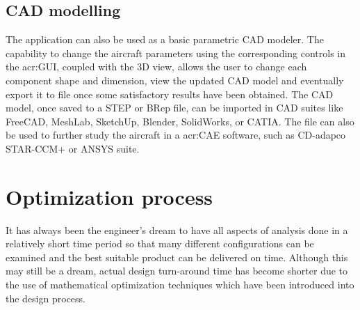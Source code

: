 \subsection{CAD modelling}
The application can also be used as a basic parametric CAD modeler. The capability to change the aircraft parameters using the corresponding controls in the \gls{acr:GUI}, coupled with the 3D view, allows the user to change each component shape and dimension, view the updated CAD model and eventually export it to file once some satisfactory results have been obtained.
%
The CAD model, once saved to a STEP or BRep file, can be imported in CAD suites like FreeCAD, MeshLab, SketchUp, Blender, SolidWorks, or CATIA. The file can also be used to further study the aircraft in a \gls{acr:CAE} software, such as CD-adapco STAR-CCM+ or ANSYS suite.
%
\section{Optimization process}
\label{par:Optimization}
It has always been the engineer’s dream to have all aspects of analysis done in a relatively short time period so that many different configurations can be examined and the best suitable product can be delivered on time. Although this may still be a dream, actual design turn-around time has become shorter due to the use of mathematical optimization techniques which have been introduced into the design process.\cite{torenbeek2013advanced}

